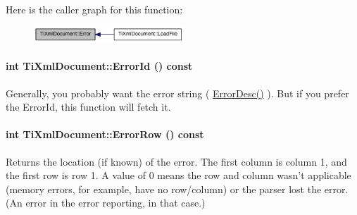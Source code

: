 Here is the caller graph for this function:\nopagebreak
\begin{figure}[H]
\begin{center}
\leavevmode
\includegraphics[width=160pt]{class_ti_xml_document_a6dfc01a6e5d58e56acd537dfd3bdeb29_icgraph}
\end{center}
\end{figure}
\hypertarget{class_ti_xml_document_af96fc2f3f9ec6422782bfe916c9e778f}{
\paragraph[{ErrorId}]{\setlength{\rightskip}{0pt plus 5cm}int TiXmlDocument::ErrorId () const}\hfill}
\label{class_ti_xml_document_af96fc2f3f9ec6422782bfe916c9e778f}
Generally, you probably want the error string ( \hyperlink{class_ti_xml_document_a9d0f689f6e09ea494ea547be8d79c25e}{ErrorDesc()} ). But if you prefer the ErrorId, this function will fetch it. \hypertarget{class_ti_xml_document_af30efc75e804aa2e92fb8be3a8cb676e}{
\paragraph[{ErrorRow}]{\setlength{\rightskip}{0pt plus 5cm}int TiXmlDocument::ErrorRow () const}\hfill}
\label{class_ti_xml_document_af30efc75e804aa2e92fb8be3a8cb676e}
Returns the location (if known) of the error. The first column is column 1, and the first row is row 1. A value of 0 means the row and column wasn't applicable (memory errors, for example, have no row/column) or the parser lost the error. (An error in the error reporting, in that case.)

